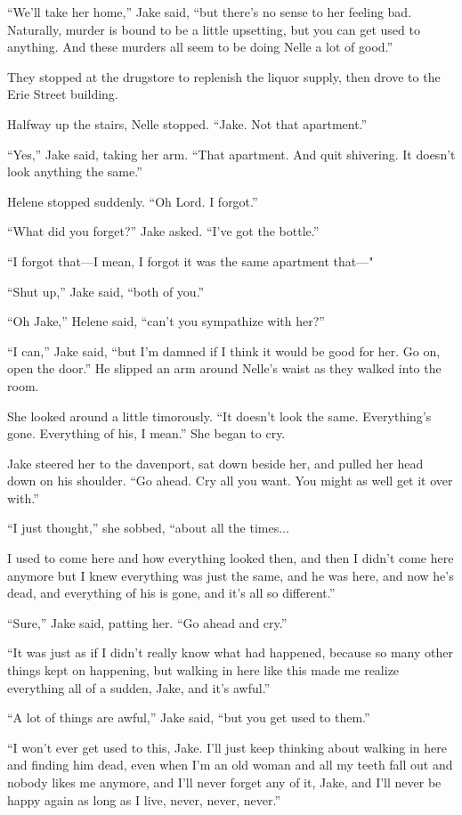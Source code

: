 \documentclass{novel}
\begin{document}
“We’ll take her home,” Jake said, “but there’s no sense to her feeling bad. Naturally, murder is bound to be a little upsetting, but you can get used to anything. And these murders all seem to be doing Nelle a lot of good.”

They stopped at the drugstore to replenish the liquor supply, then drove to the Erie Street building.

Halfway up the stairs, Nelle stopped. “Jake. Not that apartment.”

“Yes,” Jake said, taking her arm. “That apartment. And quit shivering. It doesn’t look anything the same.”

Helene stopped suddenly. “Oh Lord. I forgot.”

“What did you forget?” Jake asked. “I’ve got the bottle.”

“I forgot that—I mean, I forgot it was the same apartment that—"

“Shut up,” Jake said, “both of you.”

“Oh Jake,” Helene said, “can’t you sympathize with her?”

“I can,” Jake said, “but I’m damned if I think it would be good for her. Go on, open the door.” He slipped an arm around Nelle’s waist as they walked into the room.

She looked around a little timorously. “It doesn’t look the same. Everything’s gone. Everything of his, I mean.” She began to cry.

Jake steered her to the davenport, sat down beside her, and pulled her head down on his shoulder. “Go ahead. Cry all you want. You might as well get it over with.”

“I just thought,” she sobbed, “about all the times...

I used to come here and how everything looked then, and then I didn’t come here anymore but I knew everything was just the same, and he was here, and now he’s dead, and everything of his is gone, and it’s all so different.”

“Sure,” Jake said, patting her. “Go ahead and cry.”

“It was just as if I didn’t really know what had happened, because so many other things kept on happening, but walking in here like this made me realize everything all of a sudden, Jake, and it’s awful.”

“A lot of things are awful,” Jake said, “but you get used to them.”

“I won’t ever get used to this, Jake. I’ll just keep thinking about walking in here and finding him dead, even when I'm an old woman and all my teeth fall out and nobody likes me anymore, and I’ll never forget any of it, Jake, and I'll never be happy again as long as I live, never, never, never.”
\end{document}
